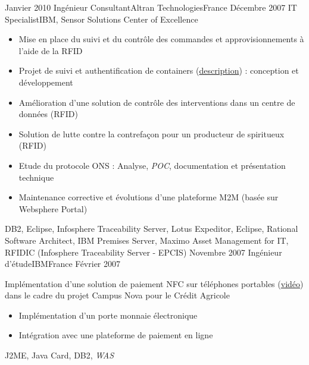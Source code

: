 \begin{experiences}
{  }
  \emptySeparator
  \consultantexperience
  {Janvier 2010}    {Ingénieur Consultant}{Altran Technologies}{France}
  {Décembre 2007}   {IT Specialist}{IBM, Sensor Solutions Center of Excellence}
  {
    \begin{itemize}
      \item Mise en place du suivi et du contrôle des commandes et approvisionnements à l'aide de la RFID
      \item Projet de suivi et authentification de containers (\href{http://www.container-centralen.co.uk/rfid/history.aspx}{description}) : conception et développement
      \item Amélioration d'une solution de contrôle des interventions dans un centre de données (RFID)
      \item Solution de lutte contre la contrefaçon pour un producteur de spiritueux (RFID)
      \item Etude du protocole ONS : Analyse, \emph{POC}, documentation et présentation technique
      \item Maintenance corrective et évolutions d'une plateforme M2M (basée sur Websphere Portal)
    \end{itemize}
  }
  {
    DB2, Eclipse, Infosphere Traceability Server, Lotus Expeditor, Eclipse,
    Rational Software Architect, IBM Premises Server, Maximo Asset Management for IT, RFIDIC (Infosphere Traceability Server - EPCIS)
  }
  \emptySeparator
  \experience
  {Novembre 2007}  {Ingénieur d'étude}{IBM}{France}
  {Février 2007}   {
    Implémentation d'une solution de paiement NFC sur téléphones portables (\href{http://www.nouvo.ch/s-007}{vidéo})
    dans le cadre du projet Campus Nova pour le Crédit Agricole
    \begin{itemize}
      \item Implémentation d'un porte monnaie électronique
      \item Intégration avec une plateforme de paiement en ligne
    \end{itemize}
  }
  {J2ME, Java Card, DB2, \emph{WAS}}
\end{experiences}
